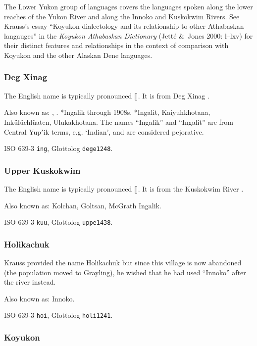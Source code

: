 \documentclass[12pt,letterpaper,oneside,article]{memoir}
\begin{document}
The Lower Yukon group of languages covers the languages spoken along the lower reaches of the Yukon River and along the Innoko and Kuskokwim Rivers.
See Krauss’s essay “Koyukon dialectology and its relationship to other Athabaskan langauges” in the \textit{Koyukon Athabaskan Dictionary} (Jetté \&\ Jones 2000: l–lxv) for their distinct features and relationships in the context of comparison with Koyukon and the other Alaskan Dene languages.

\subsubsection{Deg Xinag}\label{sec:degxinag}

The English name  is typically pronounced []. It is from Deg Xinag .

Also known as: , .
*Ingalik through 1908s.
*Ingalit, Kaiyuhkhotana, Inkülüchlüaten, Ulukakhotana.
The names “Ingalik” and “Ingalit” are from Central Yupʼik terms, e.g.  ‘Indian’, and are considered pejorative.

ISO 639-3 \texttt{ing}, Glottolog \texttt{dege1248}.

\subsubsection{Upper Kuskokwim}\label{sec:upperkuskokwim}

The English name  is typically pronounced []. It is from the Kuskokwim River .

Also known as: Kolchan, Goltsan, McGrath Ingalik.

ISO 639-3 \texttt{kuu}, Glottolog \texttt{uppe1438}.

\subsubsection{Holikachuk}\label{sec:holikachuk}

Krauss provided the name Holikachuk but since this village is now abandoned (the population moved to Grayling), he wished that he had used “Innoko” after the river instead.

Also known as: Innoko.

ISO 639-3 \texttt{hoi}, Glottolog \texttt{holi1241}.

\subsubsection{Koyukon}\label{sec:koyukon}
\end{document}
